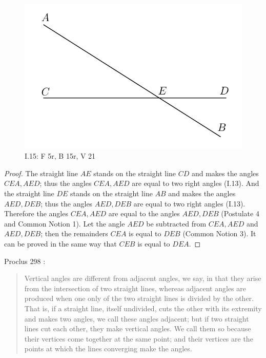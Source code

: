 \documentclass{article}
\begin{document}
\begin{figure}
\begin{center}
\includegraphics[width=\textwidth]{I15.png}
\end{center}
\caption{I.15: F 5r, B 15r, V 21}
\label{I15}
\end{figure}

\begin{proof}
The straight line $AE$ stands on the straight line $CD$ and makes the angles
$CEA,AED$; thus the angles $CEA,AED$ are equal to two right angles (I.13).
And the straight line $DE$ stands on the straight line $AB$ and makes the angles
$AED,DEB$; thus the angles $AED,DEB$ are equal to two right angles (I.13).
Therefore the angles $CEA,AED$ are equal to the angles $AED,DEB$ (Postulate 4 and Common Notion 1).
Let the angle $AED$ be subtracted from $CEA,AED$ and $AED,DEB$; then the remainders
$CEA$ is equal to $DEB$ (Common Notion 3).
It can be proved in the same way that  $CEB$ is equal to $DEA$.
\end{proof}

Proclus 298 \cite[p.~233]{proclus}:

\begin{quote}
Vertical angles are different from adjacent angles, we say,
in that they arise from the intersection of two straight lines,
whereas adjacent angles are produced when one only of the
two straight lines is divided by the other. That is, if a straight
line, itself undivided, cuts the other with its extremity and
makes two angles, we call these angles adjacent; but if two
straight lines cut each other, they make vertical angles. We
call them so because their vertices come together at the same
point; and their vertices are the points at which the lines
converging make the angles.
\end{quote}
\end{document}
